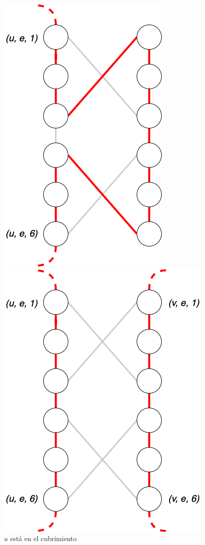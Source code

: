 \documentclass[a4paper]{article}
\begin{document}
\begin{figure}[ht]
    \begin{multicols}{3}
    \begin{center}
            \includegraphics[scale=0.2]{images/cover-testing-3.png}
            \caption{$u$ está en el cubrimiento}
            \includegraphics[scale=0.2]{images/cover-testing-4.png}

\end{center}
\end{multicols}
\end{figure}
\end{document}
